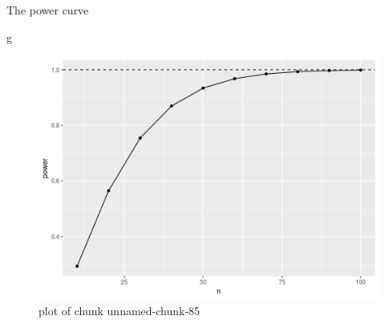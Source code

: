\documentclass[ignorenonframetext,]{beamer}
\newenvironment{Shaded}{\begin{snugshade}}{\end{snugshade}}
\newcommand{\NormalTok}[1]{#1}
\begin{document}
\begin{frame}[fragile]{The power curve}
\protect\hypertarget{the-power-curve}{}

\begin{Shaded}
\begin{Highlighting}[]
\NormalTok{g}
\end{Highlighting}
\end{Shaded}

\begin{figure}
\centering
\includegraphics{figure/unnamed-chunk-85-1.png}
\caption{plot of chunk unnamed-chunk-85}
\end{figure}

\end{frame}
\end{document}
